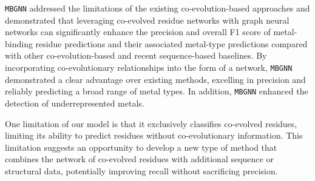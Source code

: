 \documentclass[letterpaper, 10 pt, conference]{ieeeconf}
\begin{document}
\texttt{MBGNN} addressed the limitations of the existing co-evolution-based approaches and demonstrated that leveraging co-evolved residue networks with graph neural networks can significantly enhance the precision and overall F1 score of metal-binding residue predictions and their associated metal-type predictions compared with other co-evolution-based and recent sequence-based baselines. By incorporating co-evolutionary relationships into the form of a network, \texttt{MBGNN} demonstrated a clear advantage over existing methods, excelling in precision and reliably predicting a broad range of metal types. In addition, \texttt{MBGNN} enhanced the detection of underrepresented metals.

One limitation of our model is that it exclusively classifies co-evolved residues, limiting its ability to predict residues without co-evolutionary information. This limitation suggests an opportunity to develop a new type of method that combines the network of co-evolved residues with additional sequence or structural data, potentially improving recall without sacrificing precision.






\end{document}
